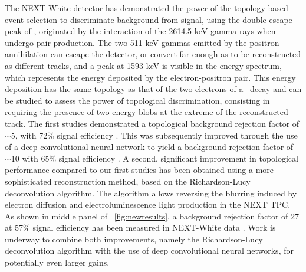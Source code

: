 The NEXT-White detector has demonstrated the power of the topology-based event selection to discriminate background from signal, using the double-escape peak of , originated by the interaction of the 2614.5 keV gamma rays when undergo pair production. The two 511 keV gammas emitted by the positron annihilation can escape the detector, or convert far enough as to be reconstructed as different tracks, and a peak at 1593 keV is visible in the energy spectrum, which represents the energy deposited by the electron-positron pair.  This energy deposition has the same topology as that of the two electrons of a \bbonu ~decay and can be studied to assess the power of topological discrimination, consisting in requiring the presence of two energy blobs at the extreme of the reconstructed track.  The first studies demonstrated a topological background rejection factor of $\sim$5, with 72\% signal efficiency \cite{Ferrario:2019kwg}. This was subsequently improved through the use of a deep convolutional neural network to yield a background rejection factor of  $\sim$10 with 65\% signal efficiency \cite{NEXT:2020jmz}. A second, significant improvement in topological performance compared to our first studies has been obtained using a more sophisticated reconstruction method, based on the Richardson-Lucy deconvolution algorithm. The algorithm allows reversing the blurring induced by electron diffusion and electroluminescence light production in the NEXT TPC. As shown in middle panel of \fig\ \ref{fig:newresults}, a  background rejection factor of 27 at 57\% signal efficiency has been measured in NEXT-White data \cite{NEXT:2021pjq}. Work is underway to combine both improvements, namely the Richardson-Lucy deconvolution algorithm with the use of deep convolutional neural networks, for potentially even larger gains.

\indent



